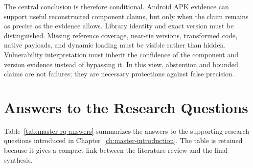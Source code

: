 The central conclusion is therefore conditional. Android APK evidence can
support useful reconstructed component claims, but only when the claim remains
as precise as the evidence allows. Library identity and exact version must be
distinguished. Missing reference coverage, near-tie versions, transformed
code, native payloads, and dynamic loading must be visible rather than hidden.
Vulnerability interpretation must inherit the confidence of the component and
version evidence instead of bypassing it. In this view, abstention and bounded
claims are not failures; they are necessary protections against false
precision.

\section{Answers to the Research Questions}

Table~\ref{tab:master-rq-answers} summarizes the answers to the supporting
research questions introduced in Chapter~\ref{ch:master-introduction}. The
table is retained because it gives a compact link between the literature
review and the final synthesis.

